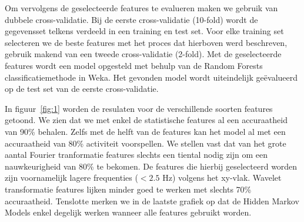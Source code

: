 \documentclass{article}
\begin{document}
Om vervolgens de geselecteerde features te evalueren maken we gebruik van dubbele cross-validatie. Bij de eerste cross-validatie (10-fold) wordt de gegevensset telkens verdeeld in een training en test set. Voor elke training set selecteren we de beste features met het proces dat hierboven werd beschreven, gebruik makend van een tweede cross-validatie (2-fold). Met de geselecteerde features wordt een model opgesteld met behulp van de Random Forests classificatiemethode in Weka. Het gevonden model wordt uiteindelijk ge\"evalueerd op de test set van de eerste cross-validatie.
	
In figuur~\ref{fig:1} worden de resulaten voor de verschillende soorten features getoond. We zien dat we met enkel de statistische features al een accuraatheid van 90\% behalen. Zelfs met de helft van de features kan het model al met een accuraatheid van 80\% activiteit voorspellen. We stellen vast dat van het grote aantal Fourier tranformatie features slechts een tiental nodig zijn om een nauwkeurigheid van 80\% te bekomen. De features die hierbij geselecteerd worden zijn voornamelijk lagere frequenties ($<2.5$ Hz) volgens het xy-vlak. Wavelet transformatie features lijken minder goed te werken met slechts 70\% accuraatheid. Tenslotte merken we in de laatste grafiek op dat de Hidden Markov Models enkel degelijk werken wanneer alle features gebruikt worden.
\end{document}
